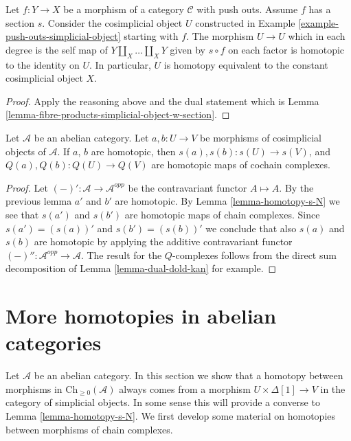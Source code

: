 \begin{lemma}
\label{lemma-push-outs-simplicial-object-w-section}
Let $f : Y \to X$ be a morphism of a category $\mathcal{C}$ with
push outs. Assume $f$ has a section $s$. Consider the
cosimplicial object $U$ constructed in
Example \ref{example-push-outs-simplicial-object}
starting with $f$. The morphism $U \to U$ which in each degree
is the self map of $Y \amalg_X \ldots \amalg_X Y$
given by $s \circ f$ on each factor is homotopic to the identity on $U$.
In particular, $U$ is homotopy equivalent to the constant
cosimplicial object $X$.
\end{lemma}

\begin{proof}
Apply the reasoning above and the dual statement which is
Lemma \ref{lemma-fibre-products-simplicial-object-w-section}.
\end{proof}

\begin{lemma}
\label{lemma-homotopy-s-Q}
Let $\mathcal{A}$ be an abelian category.
Let $a, b : U \to V$ be morphisms of cosimplicial
objects of $\mathcal{A}$. If $a$, $b$ are homotopic,
then $s(a), s(b) : s(U) \to s(V)$, and
$Q(a), Q(b) : Q(U) \to Q(V)$ are homotopic maps
of cochain complexes.
\end{lemma}

\begin{proof}
Let $(-)' : \mathcal{A} \to \mathcal{A}^{opp}$
be the contravariant functor $A \mapsto A$.
By the previous lemma $a'$ and $b'$ are homotopic.
By Lemma \ref{lemma-homotopy-s-N} we see that
$s(a')$ and $s(b')$ are homotopic maps of chain
complexes. Since $s(a') = (s(a))'$ and
$s(b') = (s(b))'$ we conclude that also
$s(a)$ and $s(b)$ are homotopic by applying
the additive
contravariant functor $(-)'' : \mathcal{A}^{opp} \to \mathcal{A}$.
The result for the $Q$-complexes follows from the direct sum decomposition of
Lemma \ref{lemma-dual-dold-kan} for example.
\end{proof}




\section{More homotopies in abelian categories}
\label{section-backwards-homotopy}

\noindent
Let $\mathcal{A}$ be an abelian category.
In this section we show that a homotopy between
morphisms in $\text{Ch}_{\geq 0}(\mathcal{A})$
always comes from a morphism $U \times \Delta[1] \to V$
in the category of simplicial objects. In some sense
this will provide a converse to Lemma \ref{lemma-homotopy-s-N}.
We first develop some material on homotopies between morphisms
of chain complexes.

